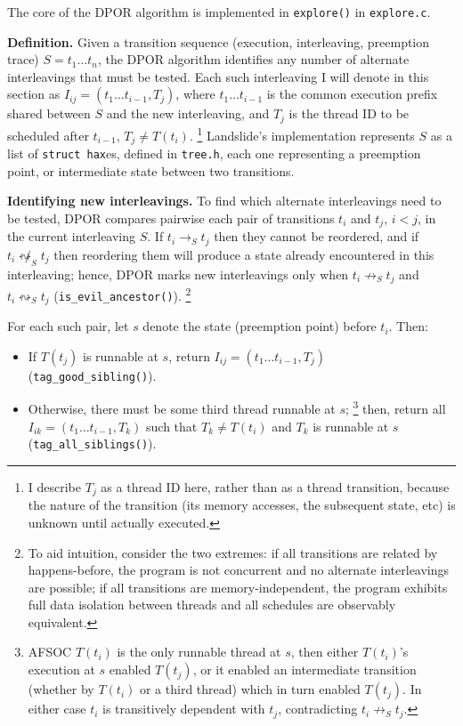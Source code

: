 The core of the DPOR algorithm is implemented in {\tt explore()} in {\tt explore.c}.

{\bf Definition.}
Given a transition sequence (execution, interleaving, preemption trace) $S = t_1 \dots t_n$,
the DPOR algorithm identifies any number of alternate interleavings that must be tested.
Each such interleaving I will denote in this section as $I_{ij} = (t_1 \dots t_{i-1}, T_j)$,
where $t_1 \dots t_{i-1}$ is the common execution prefix shared between $S$ and the new interleaving,
and $T_j$ is the thread ID to be scheduled after $t_{i-1}$, $T_j \ne T(t_i)$.
\footnote{I describe $T_j$ as a thread ID here, rather than as a thread transition,
because the nature of the transition (its memory accesses, the subsequent state, etc)
is unknown until actually executed.}
Landslide's implementation represents $S$ as a list of {\tt struct hax}es, defined in {\tt tree.h},
each one representing a preemption point, or intermediate state between two transitions.

{\bf Identifying new interleavings.}
To find which alternate interleavings need to be tested,
DPOR compares pairwise each pair of transitions $t_i$ and $t_j$, $i<j$, in the current interleaving $S$.
If $t_i \rightarrow_S t_j$ then they cannot be reordered,
and if $t_i \not\leftrightsquigarrow_S t_j$ then reordering them
will produce a state already encountered in this interleaving;
hence, DPOR marks new interleavings only
when $t_i \not\rightarrow_S t_j$ and $t_i \leftrightsquigarrow_S t_j$
({\tt is\_evil\_ancestor()}).
\footnote{To aid intuition, consider the two extremes:
if all transitions are related by happens-before,
the program is not concurrent and no alternate interleavings are possible;
if all transitions are memory-independent,
the program exhibits full data isolation between threads and all schedules are observably equivalent.}

For each such pair, let $s$ denote the state (preemption point) before $t_i$.
Then:
\begin{itemize}
	\item If $T(t_j)$ is runnable at $s$, return $I_{ij} = (t_1 \dots t_{i-1}, T_j)$ ({\tt tag\_good\_sibling()}).
	\item Otherwise, there must be some third thread runnable at $s$;%
		\footnote{AFSOC $T(t_i)$ is the only runnable thread at $s$,
		then either $T(t_i)$'s execution at $s$ enabled $T(t_j)$,
		or it enabled an intermediate transition
		(whether by $T(t_i)$ or a third thread)
		which in turn enabled $T(t_j)$.
		In either case $t_i$ is transitively dependent with $t_j$, contradicting $t_i \not\rightarrow_S t_j$.}
		then, return all $I_{ik} = (t_1 \dots t_{i-1}, T_k)$ such that
		$T_k \ne T(t_i)$ and $T_k$ is runnable at $s$
		({\tt tag\_all\_siblings()}).
\end{itemize}

